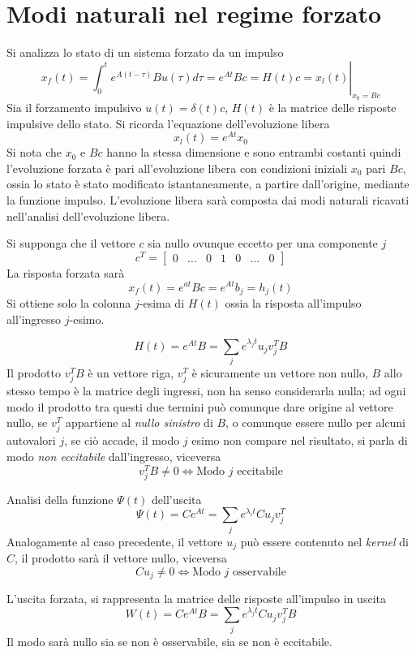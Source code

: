 
\section{Modi naturali nel regime forzato}
Si analizza lo stato di un sistema forzato da un impulso
$$
x_f(t) = \left.\int_{0}^t e^{A(t-\tau)}Bu(\tau) d\tau = e^{At}Bc = H(t)c =
x_l(t)\right|_{x_0=Bc}
$$
Sia il forzamento impulsivo $ u(t)  = \delta(t)c$, $H(t)$ è la matrice delle
risposte impulsive dello stato.
Si ricorda l'equazione dell'evoluzione libera
$$
x_l(t) = e^{At}x_0
$$
Si nota che $x_0$ e $Bc$ hanno la stessa dimensione e sono entrambi costanti
quindi l'evoluzione forzata è pari all'evoluzione libera con condizioni
iniziali $x_0$ pari $Bc$, ossia lo stato è stato modificato istantaneamente, a
partire dall'origine, mediante la funzione impulso.
L'evoluzione libera sarà composta dai modi naturali ricavati nell'analisi
dell'evoluzione libera.

Si supponga che il vettore $c$ sia nullo ovunque eccetto per una componente $j$
$$
c^T= \begin{bmatrix}
0& \ldots & 0 & 1 & 0 & \ldots & 0
\end{bmatrix}
$$
La risposta forzata sarà
$$
x_f(t)=e^{at}Bc = e^{At}b_j = h_j(t)
$$
Si ottiene solo la colonna $j$-esima di $H(t)$ ossia la risposta all'impulso
all'ingresso $j$-esimo.

$$
H(t) = e^{At}B = \sum_j e^{\lambda_j t}u_jv_j^TB
$$
Il prodotto $v_j^TB$ è un vettore riga, $v_j^T$ è sicuramente un vettore non
nullo, $B$ allo stesso tempo è la matrice degli ingressi, non ha senso
considerarla nulla; ad ogni modo il prodotto tra questi due termini può
comunque dare origine al vettore nullo, se $v_j^T$ appartiene al \textit{nullo
sinistro} di $B$, o comunque essere nullo per alcuni autovalori $j$, se ciò
accade, il modo $j$ esimo non compare nel risultato, si parla di modo
\textit{non eccitabile} dall'ingresso, viceversa
$$
v_j^TB \neq 0 \Leftrightarrow \text{Modo $j$ eccitabile}
$$

Analisi della funzione $\Psi(t)$ dell'uscita
$$
\Psi(t) = Ce^{At} = \sum_j e^{\lambda_i t} Cu_jv_j^T
$$
Analogamente al caso precedente, il vettore $u_j$ può essere contenuto nel
\textit{kernel} di $C$, il prodotto sarà il vettore nullo, viceversa
$$
Cu_j\neq 0 \Leftrightarrow \text{Modo $j$ osservabile}
$$

L'uscita forzata, si rappresenta la matrice delle risposte all'impulso in uscita
$$
W(t) = Ce^{At}B = \sum_j e^{\lambda_j t} C u_jv_j^T B
$$
Il modo sarà nullo sia se non è osservabile, sia se non è eccitabile.


